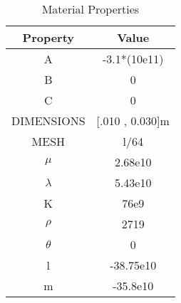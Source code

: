 \begin{table}
\caption{Material Properties}
\begin{tabular}{|c|c|}
\hline
\textbf{Property} & \textbf{Value} \\ \hline
A & -3.1*(10e11) \\ \hline
B & 0 \\ \hline
C & 0 \\ \hline
DIMENSIONS & [.010 , 0.030]m \\ \hline
MESH & l/64 \\ \hline
$\mu$ & 2.68e10 \\ \hline
$\lambda$ & 5.43e10 \\ \hline
K & 76e9 \\ \hline
$\rho$ & 2719 \\ \hline
$\theta$ & 0 \\ \hline
l & -38.75e10 \\ \hline
m & -35.8e10 \\ \hline
\end{tabular}
\end{table}